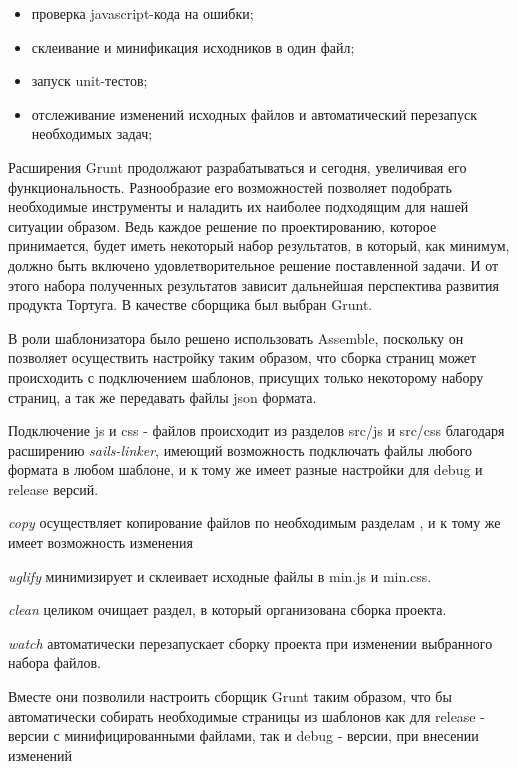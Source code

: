 \begin{itemize}
  \item проверка javascript-кода на ошибки;
  \item склеивание и минификация исходников в один файл;
  \item запуск unit-тестов;
  \item отслеживание изменений исходных файлов и автоматический перезапуск необходимых задач;
\end{itemize}


Расширения Grunt продолжают разрабатываться и сегодня, увеличивая его функциональность. Разнообразие его возможностей позволяет подобрать необходимые инструменты и наладить их наиболее подходящим для нашей ситуации образом. Ведь каждое решение по проектированию, которое принимается, будет иметь некоторый набор результатов, в который, как минимум, должно быть включено удовлетворительное решение поставленной задачи. И от этого набора полученных результатов зависит дальнейшая перспектива развития продукта Тортуга. В качестве сборщика был выбран Grunt.

В роли шаблонизатора было решено использовать Assemble, поскольку он позволяет осуществить настройку  таким образом, что сборка страниц может происходить с подключением шаблонов, присущих только некоторому набору страниц, а так же передавать файлы json формата.

Подключение js и css - файлов происходит из разделов src/js и src/css благодаря расширению \textit{sails-linker}, имеющий возможность подключать файлы любого формата в любом шаблоне, и к тому же имеет разные настройки для debug и release версий.

\textit{copy} осуществляет копирование файлов по необходимым разделам , и к тому же имеет возможность изменения 

\textit{uglify} минимизирует и склеивает исходные файлы в min.js и min.css.

\textit{clean} целиком очищает раздел, в который организована сборка проекта.

\textit{watch} автоматически перезапускает сборку проекта при изменении выбранного набора файлов.


Вместе они позволили настроить сборщик Grunt таким образом, что бы автоматически собирать необходимые страницы из шаблонов как для release - версии с минифицированными файлами, так и debug - версии, при внесении изменений

\clearpage